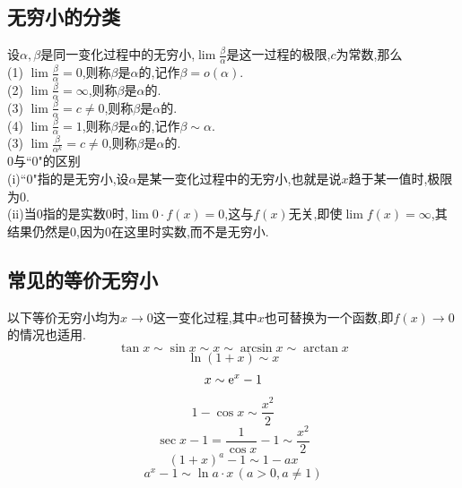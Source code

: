 \subsection{无穷小的分类}
\tdefination[无穷小的分类]
设$\alpha,\beta $是同一变化过程中的无穷小,$\displaystyle \lim \frac{\beta}{\alpha}$是这一过程的极限,$c$为常数,那么\\[0.5em]
\noindent (1) \quad $\displaystyle \lim \frac{\beta }{\alpha}=0$,则称$\beta $是$\alpha $的,记作$\beta = o(\alpha)$.\\[0.5em]
\noindent (2) \quad  $\displaystyle \lim \frac{\beta }{\alpha}=\infty$,则称$\beta $是$\alpha $的.\\[0.5em]
\noindent (3) \quad  $\displaystyle \lim \frac{\beta }{\alpha}=c \ne 0$,则称$\beta $是$\alpha $的.\\[0.5em]
\noindent (4) \quad  $\displaystyle \lim \frac{\beta }{\alpha}=1$,则称$\beta $是$\alpha $的,记作$\beta \sim \alpha$.\\[0.5em]
\noindent (3) \quad  $\displaystyle \lim \frac{\beta }{\alpha^k}=c \ne 0$,则称$\beta $是$\alpha $的.\\[0.5em]
\quad 0与``0"的区别\\[0.5em]
\noindent (i)\quad ``0"指的是无穷小,设$\alpha$是某一变化过程中的无穷小,也就是说$x$趋于某一值时,极限为0.\\[0.5em]
\noindent (ii)\quad 当0指的是实数0时,$\lim 0 \cdot f(x)=0$,这与$f(x)$无关,即使$\lim f(x)=\infty$,其结果仍然是0,因为0在这里时实数,而不是无穷小.\jg

\subsection{常见的等价无穷小}
\ttheorem[常见的等价无穷小]
以下等价无穷小均为$x \to 0$这一变化过程,其中$x$也可替换为一个函数,即$f(x) \to 0$的情况也适用.
\begin{equation}
\tan x \sim \sin x \sim x \sim \arcsin x \sim \arctan x
\end{equation}
\begin{equation}
\ln (1+x) \sim x
\end{equation}
\begin{equation}
x \sim {\rm{e}}^x -1
\end{equation}
\begin{equation}
1-\cos x \sim \frac{x^2}{2}
\end{equation}
\begin{equation}
\sec x -1 =\frac{1}{\cos x}-1 \sim \frac{x^2}{2}
\end{equation}
\begin{equation}
(1+x)^a-1 \sim 1-ax
\end{equation}
\begin{equation}
a^x-1 \sim \ln a \cdot x \,(a>0,a \ne 1)
\end{equation}
